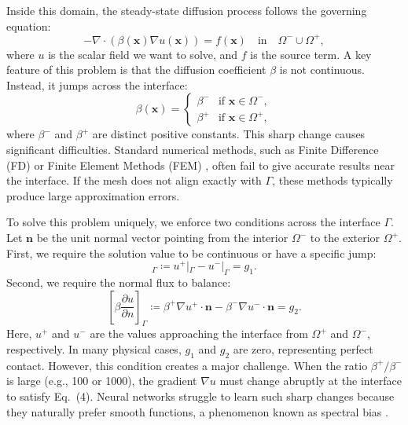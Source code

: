 \documentclass[11pt]{article}
\theoremstyle{definition}
\theoremstyle{remark}
\theoremstyle{plain}
\begin{document}
Inside this domain, the steady-state diffusion process follows the governing equation:
\begin{equation}
    -\nabla \cdot (\beta(\mathbf{x}) \nabla u(\mathbf{x})) = f(\mathbf{x}) \quad \text{in} \quad \Omega^- \cup \Omega^+,
\end{equation}
where $u$ is the scalar field we want to solve, and $f$ is the source term. A key feature of this problem is that the diffusion coefficient $\beta$ is not continuous. Instead, it jumps across the interface:
\begin{equation}
    \beta(\mathbf{x}) =
    \begin{cases}
        \beta^- & \text{if } \mathbf{x} \in \Omega^-, \\
        \beta^+ & \text{if } \mathbf{x} \in \Omega^+,
    \end{cases}
\end{equation}
where $\beta^-$ and $\beta^+$ are distinct positive constants. This sharp change causes significant difficulties. Standard numerical methods, such as Finite Difference (FD) \cite{liszka1980finite} or Finite Element Methods (FEM) \cite{babuvska1970finite}, often fail to give accurate results near the interface. If the mesh does not align exactly with $\Gamma$, these methods typically produce large approximation errors.

To solve this problem uniquely, we enforce two conditions across the interface $\Gamma$. Let $\mathbf{n}$ be the unit normal vector pointing from the interior $\Omega^-$ to the exterior $\Omega^+$. First, we require the solution value to be continuous or have a specific jump:
\begin{equation}
    [u]_\Gamma \coloneqq u^+|_\Gamma - u^-|_\Gamma = g_1.
\end{equation}
Second, we require the normal flux to balance:
\begin{equation}
    \left[\beta \frac{\partial u}{\partial n}\right]_\Gamma \coloneqq \beta^+ \nabla u^+ \cdot \mathbf{n} - \beta^- \nabla u^- \cdot \mathbf{n} = g_2.
\end{equation}
Here, $u^+$ and $u^-$ are the values approaching the interface from $\Omega^+$ and $\Omega^-$, respectively. In many physical cases, $g_1$ and $g_2$ are zero, representing perfect contact. However, this condition creates a major challenge. When the ratio $\beta^+/\beta^-$ is large (e.g., 100 or 1000), the gradient $\nabla u$ must change abruptly at the interface to satisfy Eq.~(4). Neural networks struggle to learn such sharp changes because they naturally prefer smooth functions, a phenomenon known as spectral bias \cite{rahaman2019spectral}.
\end{document}
